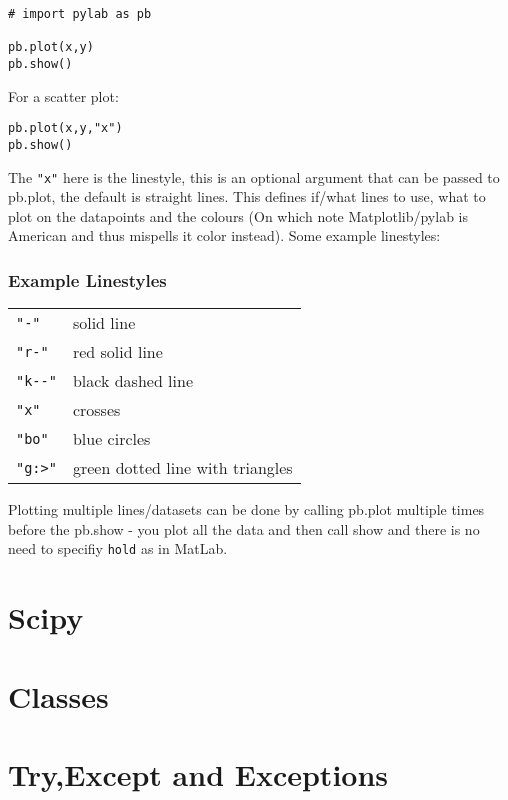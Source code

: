 \documentclass[11pt,a4paper]{article}
\begin{document}
\begin{verbatim}
# import pylab as pb

pb.plot(x,y)
pb.show()
\end{verbatim}

For a scatter plot:

\begin{verbatim}
pb.plot(x,y,"x")
pb.show()
\end{verbatim}

The \verb|"x"| here is the linestyle, this is an optional argument that can be passed to pb.plot, the default is straight lines. This defines if/what lines to use, what to plot on the datapoints and the colours (On which note Matplotlib/pylab is American and thus mispells it color instead). Some example linestyles:

\subsubsection{Example Linestyles}
\begin{center}
\begin{tabular}{l l}
\verb|"-"| & solid line\\
\verb|"r-"| & red solid line\\
\verb|"k--"| & black dashed line\\
\verb|"x"| & crosses\\
\verb|"bo"| & blue circles\\
\verb|"g:>"| & green dotted line with triangles\\
\end{tabular}
\end{center}

Plotting multiple lines/datasets can be done by calling pb.plot multiple times before the pb.show - you plot all the data and then call show and there is no need to specifiy \verb|hold| as in MatLab. 

\section{Scipy}

\section{Classes}



\section{Try,Except and Exceptions}
\end{document}

